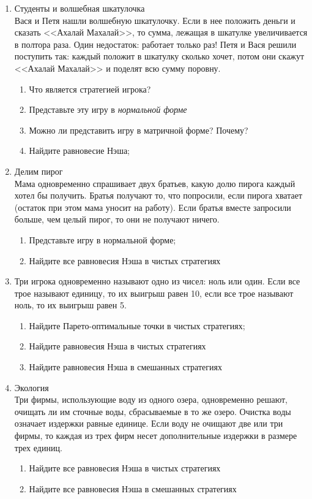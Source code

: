 \documentclass[pdftex,12pt,a4paper]{article}
\begin{document}
\begin{enumerate}
\item Студенты и волшебная шкатулочка \\
Вася и Петя нашли волшебную шкатулочку. Если в нее положить деньги и сказать <<Ахалай Махалай>>, то сумма, лежащая в шкатулке увеличивается в полтора раза. Один недостаток: работает только раз! Петя и Вася решили поступить так: каждый положит в шкатулку сколько хочет, потом они скажут <<Ахалай Махалай>> и поделят всю сумму поровну.
\begin{enumerate}
\item Что является стратегией игрока?
\item Представьте эту игру в \textit{нормальной форме}
\item Можно ли представить игру в матричной форме? Почему?
\item Найдите равновесие Нэша;
\end{enumerate}

\item Делим пирог\\
Мама одновременно спрашивает двух братьев, какую долю пирога каждый хотел бы получить. Братья получают то, что попросили, если пирога хватает (остаток при этом мама уносит на работу). Если братья вместе запросили больше, чем целый пирог, то они не получают ничего.
\begin{enumerate}
\item Представьте игру в нормальной форме;
\item Найдите все равновесия Нэша в чистых стратегиях
\end{enumerate}

\item Три игрока одновременно называют одно из чисел: ноль или один. Если все трое называют единицу, то их выигрыш равен 10, если все трое называют ноль, то их выигрыш равен 5.
\begin{enumerate}
\item Найдите Парето-оптимальные точки в чистых стратегиях;
\item Найдите равновесия Нэша в чистых стратегиях 
\item Найдите равновесия Нэша в смешанных стратегиях 
\end{enumerate}

\item Экология \\
Три фирмы, использующие воду из одного озера, одновременно решают, очищать ли им сточные воды, сбрасываемые в то же озеро. Очистка воды означает издержки равные единице. Если воду не очищают две или три фирмы, то каждая из трех фирм несет дополнительные издержки в размере трех единиц.
\begin{enumerate}
\item Найдите все равновесия Нэша в чистых стратегиях
\item Найдите все равновесия Нэша в смешанных стратегиях
\end{enumerate}


\end{enumerate}
\end{document}
